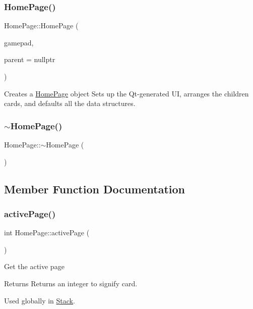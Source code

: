 \subsubsection{\texorpdfstring{HomePage()}{HomePage()}}
{\footnotesize\ttfamily Home\+Page\+::\+Home\+Page (\begin{DoxyParamCaption}\item[{Q\+Gamepad $\ast$}]{gamepad,  }\item[{Q\+Widget $\ast$}]{parent = {\ttfamily nullptr} }\end{DoxyParamCaption})\hspace{0.3cm}{\ttfamily [explicit]}}

Creates a \mbox{\hyperlink{classHomePage}{Home\+Page}} object Sets up the Qt-\/generated UI, arranges the children cards, and defaults all the data structures. \mbox{\label{classHomePage_aff8e741021104752949c6935c7407f90}} 
\subsubsection{\texorpdfstring{$\sim$HomePage()}{~HomePage()}}
{\footnotesize\ttfamily Home\+Page\+::$\sim$\+Home\+Page (\begin{DoxyParamCaption}{ }\end{DoxyParamCaption})}



\subsection{Member Function Documentation}
\mbox{\label{classHomePage_a0b6a91525a77e5ea66505666f7ba7c8d}} 
\subsubsection{\texorpdfstring{activePage()}{activePage()}}
{\footnotesize\ttfamily int Home\+Page\+::active\+Page (\begin{DoxyParamCaption}{ }\end{DoxyParamCaption})}

Get the active page \begin{DoxyReturn}{Returns}
Returns an integer to signify card.
\end{DoxyReturn}
Used globally in \mbox{\hyperlink{classStack}{Stack}}. \mbox{\label{classHomePage_a63840fcd32af69c7d788ac93f6def734}} 
